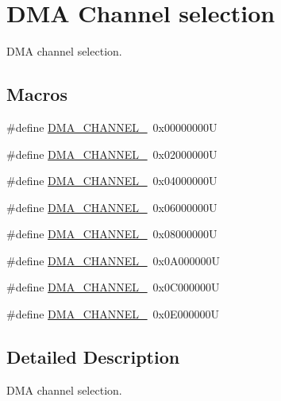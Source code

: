 \hypertarget{group___d_m_a___channel__selection}{}\section{D\+MA Channel selection}
\label{group___d_m_a___channel__selection}


D\+MA channel selection.  


\subsection*{Macros}
\begin{DoxyCompactItemize}
\item 
\#define \mbox{\hyperlink{group___d_m_a___channel__selection_gabd7de138931e93a90fc6c4eab5916bbe}{D\+M\+A\+\_\+\+C\+H\+A\+N\+N\+E\+L\+\_}}~0x00000000U
\item 
\#define \mbox{\hyperlink{group___d_m_a___channel__selection_ga283364370e9876af6406b9fa70e2944f}{D\+M\+A\+\_\+\+C\+H\+A\+N\+N\+E\+L\+\_}}~0x02000000U
\item 
\#define \mbox{\hyperlink{group___d_m_a___channel__selection_ga9688f3e78cbc2109d214b7ca049e22df}{D\+M\+A\+\_\+\+C\+H\+A\+N\+N\+E\+L\+\_}}~0x04000000U
\item 
\#define \mbox{\hyperlink{group___d_m_a___channel__selection_gac689673fec4d72ede49a0d657e3a7e70}{D\+M\+A\+\_\+\+C\+H\+A\+N\+N\+E\+L\+\_}}~0x06000000U
\item 
\#define \mbox{\hyperlink{group___d_m_a___channel__selection_ga51b51f5b39e23b28ad99520ad5be596f}{D\+M\+A\+\_\+\+C\+H\+A\+N\+N\+E\+L\+\_}}~0x08000000U
\item 
\#define \mbox{\hyperlink{group___d_m_a___channel__selection_gafbaa82f3cff89858e50363c04ed0cca0}{D\+M\+A\+\_\+\+C\+H\+A\+N\+N\+E\+L\+\_}}~0x0\+A000000U
\item 
\#define \mbox{\hyperlink{group___d_m_a___channel__selection_gad23679661d8da3bc1aaacc62f99821f7}{D\+M\+A\+\_\+\+C\+H\+A\+N\+N\+E\+L\+\_}}~0x0\+C000000U
\item 
\#define \mbox{\hyperlink{group___d_m_a___channel__selection_ga77ff4e8675a3991feb20e385242f34ab}{D\+M\+A\+\_\+\+C\+H\+A\+N\+N\+E\+L\+\_}}~0x0\+E000000U
\end{DoxyCompactItemize}


\subsection{Detailed Description}
D\+MA channel selection. 



